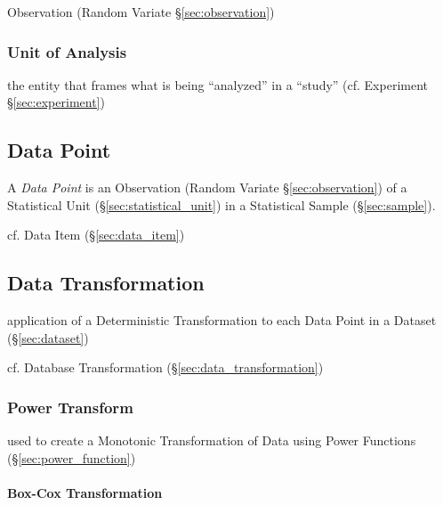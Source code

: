 \fist Observation (Random Variate \S\ref{sec:observation})



\subsubsection{Unit of Analysis}\label{sec:analysis_unit}

the entity that frames what is being ``analyzed'' in a ``study'' (cf. Experiment
\S\ref{sec:experiment})



\subsection{Data Point}\label{sec:data_point}

A \emph{Data Point} is an Observation (Random Variate \S\ref{sec:observation})
of a Statistical Unit (\S\ref{sec:statistical_unit}) in a Statistical Sample
(\S\ref{sec:sample}).

cf. Data Item (\S\ref{sec:data_item})



\subsection{Data Transformation}\label{sec:dataset_transformation}

application of a Deterministic Transformation to each Data Point in a Dataset
(\S\ref{sec:dataset})

\fist cf. Database Transformation (\S\ref{sec:data_transformation})



\subsubsection{Power Transform}\label{sec:power_transform}

used to create a Monotonic Transformation of Data using Power Functions
(\S\ref{sec:power_function})



\paragraph{Box-Cox Transformation}\label{sec:boxcox_transformation}\hfill

